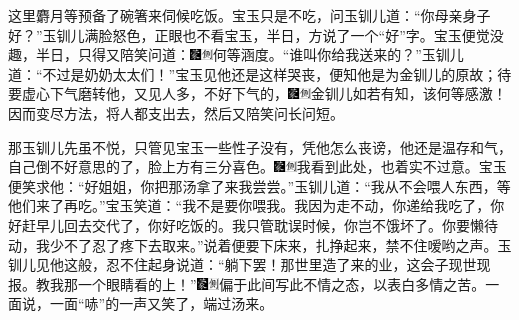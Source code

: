 这里麝月等预备了碗箸来伺候吃饭。宝玉只是不吃，问玉钏儿道：``你母亲身子好？''玉钏儿满脸怒色，正眼也不看宝玉，半日，方说了一个``好''字。宝玉便觉没趣，半日，只得又陪笑问道：{\includegraphics[width=3mm]{../Images/00006}\includegraphics[width=3mm]{../Images/00011}\footnotesize \kaishu 何等涵度。}``谁叫你给我送来的？''玉钏儿道：``不过是奶奶太太们！''宝玉见他还是这样哭丧，便知他是为金钏儿的原故；待要虚心下气磨转他，又见人多，不好下气的，{\includegraphics[width=3mm]{../Images/00006}\includegraphics[width=3mm]{../Images/00011}\footnotesize \kaishu 金钏儿如若有知，该何等感激！}因而变尽方法，将人都支出去，然后又陪笑问长问短。

那玉钏儿先虽不悦，只管见宝玉一些性子没有，凭他怎么丧谤，他还是温存和气，自己倒不好意思的了，脸上方有三分喜色。{\includegraphics[width=3mm]{../Images/00006}\includegraphics[width=3mm]{../Images/00011}\footnotesize \kaishu 我看到此处，也着实不过意。}宝玉便笑求他：``好姐姐，你把那汤拿了来我尝尝。''玉钏儿道：``我从不会喂人东西，等他们来了再吃。''宝玉笑道：``我不是要你喂我。我因为走不动，你递给我吃了，你好赶早儿回去交代了，你好吃饭的。我只管耽误时候，你岂不饿坏了。你要懒待动，我少不了忍了疼下去取来。''说着便要下床来，扎挣起来，禁不住嗳哟之声。玉钏儿见他这般，忍不住起身说道：``躺下罢！那世里造了来的业，这会子现世现报。教我那一个眼睛看的上！''{\includegraphics[width=3mm]{../Images/00006}\includegraphics[width=3mm]{../Images/00011}\footnotesize \kaishu 偏于此间写此不情之态，以表白多情之苦。}一面说，一面``哧''的一声又笑了，端过汤来。

